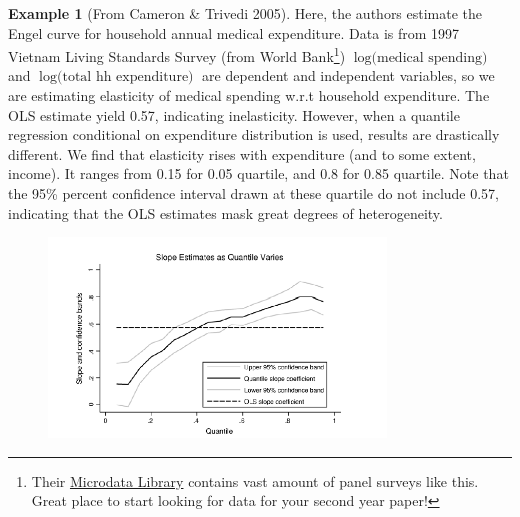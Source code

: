 \documentclass[12pt]{article}
\theoremstyle{definition}
\theoremstyle{property}
\theoremstyle{assumption}
\theoremstyle{example}
\newtheorem{example}{Example}[section]
\theoremstyle{comment}
\begin{document}
\begin{mdframed}[backgroundcolor=yellow!5]
\begin{example}[From Cameron \& Trivedi 2005]
Here, the authors estimate the Engel curve for household annual medical expenditure. Data is from 1997 Vietnam Living Standards Survey (from World Bank\footnote{Their \href{https://microdata.worldbank.org/index.php/home}{Microdata Library} contains vast amount of panel surveys like this. Great place to start looking for data for your second year paper!}) $\log{\text{(medical spending)}}$ and $\log{\text{(total hh expenditure)}}$ are dependent and independent variables, so we are estimating elasticity of medical spending w.r.t household expenditure. The OLS estimate yield 0.57, indicating inelasticity.  However, when a quantile regression conditional on expenditure distribution is used, results are drastically different. We find that elasticity rises with expenditure (and to some extent, income). It ranges from 0.15 for 0.05 quartile, and 0.8 for 0.85 quartile. Note that the 95\% percent confidence interval drawn at these quartile do not include 0.57, indicating that the OLS estimates mask great degrees of heterogeneity. 
\begin{figure}[H]
\centering
\includegraphics[keepaspectratio, width=0.8\textwidth]{qr_vietnam.png}
\end{figure}
\end{example}
\end{mdframed}
\end{document}
